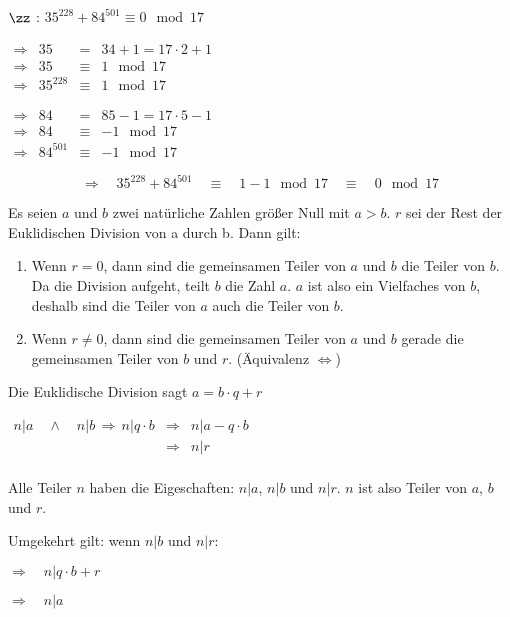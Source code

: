 \documentclass[main.tex]{subfiles}
\begin{document}
\begin{Beispiel}
	$\zz$ : $35^{228} + 84^{501} \equiv 0 \mod 17$

	\begin{minipage}[b]{0.3\linewidth}
		$\begin{array}{rccl}
			\Rightarrow & 35 &=& 34 + 1 = 17 \cdot 2 + 1 \\
			\Rightarrow & 35 &\equiv& 1 \mod 17\\
			\Rightarrow & 35^{228} &\equiv& 1 \mod 17
		\end{array}$
	\end{minipage}
	\hfill \vline \hfill
	\begin{minipage}[b]{0.6\linewidth}
		$\begin{array}{rccl}
			\Rightarrow & 84 &=& 85 - 1 = 17 \cdot 5 - 1 \\
			\Rightarrow & 84 &\equiv& -1 \mod 17 \\
			\Rightarrow & 84^{501} &\equiv& -1 \mod 17
		\end{array}$
	\end{minipage}
	$$\Rightarrow \quad 35^{228} + 84^{501}\quad\equiv\quad 1-1 \mod 17 \quad\equiv\quad 0 \mod 17$$
\end{Beispiel}

\begin{Definition}
	Es seien $a$ und $b$ zwei natürliche Zahlen größer Null mit $a>b$. $r$ sei der Rest der Euklidischen Division von a durch b. Dann gilt:

	\begin{enumerate}
		\item Wenn $r = 0$, dann sind die gemeinsamen Teiler von $a$ und $b$ die Teiler von $b$. Da die Division aufgeht, teilt $b$ die Zahl $a$. $a$ ist also ein Vielfaches von $b$, deshalb sind die Teiler von $a$ auch die Teiler von $b$.
		\item Wenn $r \neq 0$, dann sind die gemeinsamen Teiler von $a$ und $b$ gerade die gemeinsamen Teiler von $b$ und $r$. (Äquivalenz $\Leftrightarrow$)
	\end{enumerate}
\end{Definition}

\begin{Beweis}
	Die Euklidische Division sagt \quad $a = b \cdot q +r$
	
	$\begin{array}{rcl}
		n | a \quad \land \quad n | b \, \Rightarrow \, n | q \cdot b & \Rightarrow & n | a - q\cdot b \\
		& \Rightarrow & n | r \\
	\end{array}$
	
	Alle Teiler $n$ haben die Eigeschaften: $n | a$, $n | b$ und $n | r$. $n$ ist also Teiler von $a$, $b$ und $r$.
	
	Umgekehrt gilt: wenn $n | b$ und $n | r$:
	
	$\Rightarrow \quad n | q \cdot b + r$

	$\Rightarrow \quad $$n | a$
\end{Beweis}
\end{document}
